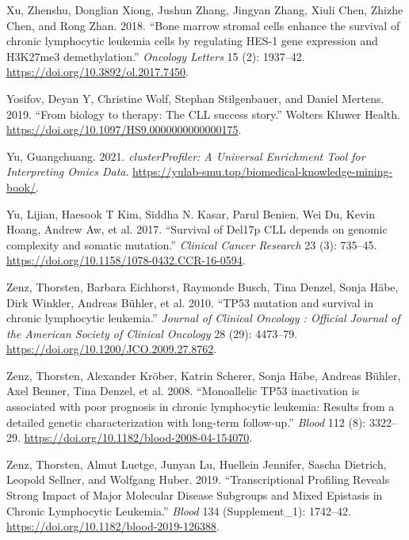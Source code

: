 \documentclass[11pt, a4paper, twosided]{book}
\newenvironment{CSLReferences}%
  {}%
  {\par}
\begin{document}
\begin{CSLReferences}{1}{0}
\leavevmode{}%
Xu, Zhenshu, Donglian Xiong, Jushun Zhang, Jingyan Zhang, Xiuli Chen, Zhizhe Chen, and Rong Zhan. 2018. {``{Bone marrow stromal cells enhance the survival of chronic lymphocytic leukemia cells by regulating HES-1 gene expression and H3K27me3 demethylation}.''} \emph{Oncology Letters} 15 (2): 1937--42. \url{https://doi.org/10.3892/ol.2017.7450}.

\leavevmode{}%
Yosifov, Deyan Y, Christine Wolf, Stephan Stilgenbauer, and Daniel Mertens. 2019. {``{From biology to therapy: The CLL success story}.''} Wolters Kluwer Health. \url{https://doi.org/10.1097/HS9.0000000000000175}.

\leavevmode{}%
Yu, Guangchuang. 2021. \emph{clusterProfiler: A Universal Enrichment Tool for Interpreting Omics Data}. \url{https://yulab-smu.top/biomedical-knowledge-mining-book/}.

\leavevmode{}%
Yu, Lijian, Haesook T Kim, Siddha N. Kasar, Parul Benien, Wei Du, Kevin Hoang, Andrew Aw, et al. 2017. {``{Survival of Del17p CLL depends on genomic complexity and somatic mutation}.''} \emph{Clinical Cancer Research} 23 (3): 735--45. \url{https://doi.org/10.1158/1078-0432.CCR-16-0594}.

\leavevmode{}%
Zenz, Thorsten, Barbara Eichhorst, Raymonde Busch, Tina Denzel, Sonja Häbe, Dirk Winkler, Andreas Bühler, et al. 2010. {``{TP53 mutation and survival in chronic lymphocytic leukemia.}''} \emph{Journal of Clinical Oncology : Official Journal of the American Society of Clinical Oncology} 28 (29): 4473--79. \url{https://doi.org/10.1200/JCO.2009.27.8762}.

\leavevmode{}%
Zenz, Thorsten, Alexander Kröber, Katrin Scherer, Sonja Häbe, Andreas Bühler, Axel Benner, Tina Denzel, et al. 2008. {``{Monoallelic TP53 inactivation is associated with poor prognosis in chronic lymphocytic leukemia: Results from a detailed genetic characterization with long-term follow-up}.''} \emph{Blood} 112 (8): 3322--29. \url{https://doi.org/10.1182/blood-2008-04-154070}.

\leavevmode{}%
Zenz, Thorsten, Almut Luetge, Junyan Lu, Huellein Jennifer, Sascha Dietrich, Leopold Sellner, and Wolfgang Huber. 2019. {``{Transcriptional Profiling Reveals Strong Impact of Major Molecular Disease Subgroups and Mixed Epistasis in Chronic Lymphocytic Leukemia}.''} \emph{Blood} 134 (Supplement\_1): 1742--42. \url{https://doi.org/10.1182/blood-2019-126388}.


\end{CSLReferences}
\end{document}
